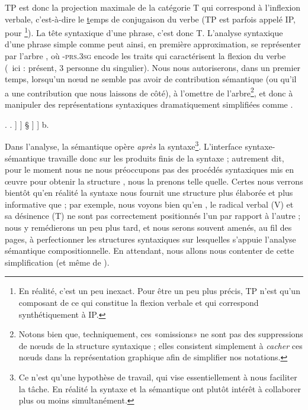 TP est donc la projection maximale de la catégorie T qui correspond à l'inflexion verbale, c'est-à-dire le \uline{t}emps de conjugaison du verbe (TP est parfois appelé IP, pour \footnote{En réalité, c'est un peu inexact. Pour être un peu plus précis, TP n'est qu'un composant de ce qui constitue la flexion verbale et qui correspond synthétiquement à IP.}).  La tête syntaxique d'une phrase, c'est donc T.
L'analyse syntaxique d'une phrase simple comme  peut ainsi, en première approximation, se représenter par l'arbre \Next[a], où {\scshape -prs.3sg} encode les traits qui caractérisent la flexion du verbe (\ie\ ici : présent, {3\ieme} personne du singulier).  
Nous nous autoriserons, dans un premier temps, lorsqu'un n\oe ud ne semble pas avoir de contribution sémantique (ou qu'il a une contribution que nous laissons de côté), à l'omettre de l'arbre\footnote{Notons bien que, techniquement, ces «omissions» ne sont pas des suppressions de n\oe uds de la structure syntaxique ; elles consistent simplement à \emph{cacher} ces n\oe uds dans la représentation graphique afin de simplifier nos notations.}, et donc à manipuler des représentations syntaxiques dramatiquement simplifiées comme \Next[b]. 


\ex.
\a. {\small
\Tree[.TP
  [.NP  Alice ]
  [.{T$'$}  [.T  \zcbox{\scshape -prs.3sg} ]  %
    [.VP  
      [.V$'$ 
        [.V  regard- ]
        [.NP  Bruno ]
      ]
    ] §\qsetw{7em} 
  ]
]
}
\qquad
b. 



Dans l'analyse, la sémantique opère \emph{après} la syntaxe\footnote{Ce n'est qu'une hypothèse de travail, qui vise essentiellement à nous faciliter la tâche. En réalité la syntaxe et la sémantique ont plutôt intérêt à collaborer plus ou moins simultanément.}. L'interface syntaxe-séman\-tique travaille donc sur les produits finis de la syntaxe ; autrement dit, pour le moment nous ne nous préoccupons pas des procédés syntaxiques mis en \oe uvre pour obtenir la structure \Last[a], nous la prenons telle quelle.  
Certes nous verrons bientôt qu'en réalité la syntaxe nous fournit une structure plus élaborée et plus informative que \Last[a] ; par exemple, nous voyons bien qu'en \Last[a], le radical verbal (V) et sa désinence (T) ne sont pas correctement positionnés l'un par rapport à l'autre ; nous y remédierons un peu plus tard, et nous serons souvent amenés, au fil des pages, à perfectionner les structures syntaxiques sur lesquelles s'appuie l'analyse sémantique compositionnelle. 
En attendant, nous allons nous contenter de cette simplification (et même de \Last[b]).

